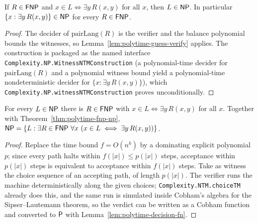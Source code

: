 \begin{theorem}
  \label{thm:polytime-fnp-np}
  \leanok
  If $R \in \mathsf{FNP}$ and $x \in L \iff \exists y\, R(x, y)$ for all $x$, then
  $L \in \mathsf{NP}$. In particular $\{x : \exists y\, R(x, y)\} \in \mathsf{NP}$ for
  every $R \in \mathsf{FNP}$.
\end{theorem}
\begin{proof}
  \leanok
  The decider of $\mathrm{pairLang}(R)$ is the verifier and the balance
  polynomial bounds the witnesses, so Lemma~\ref{lem:polytime-guess-verify}
  applies. The construction is packaged as the named interface
  \texttt{Complexity.NP.WitnessNTMConstruction} (a polynomial-time decider for
  $\mathrm{pairLang}(R)$ and a polynomial witness bound yield a
  polynomial-time nondeterministic decider for $\{x : \exists y\, R(x, y)\}$),
  which \texttt{Complexity.NP.witnessNTMConstruction} proves unconditionally.
\end{proof}

\begin{theorem}
  \label{thm:polytime-np-verifier}
  For every $L \in \mathsf{NP}$ there is $R \in \mathsf{FNP}$ with
  $x \in L \iff \exists y\, R(x, y)$ for all $x$. Together with
  Theorem~\ref{thm:polytime-fnp-np},
  $\cc{NP} = \{L : \exists R \in \cc{FNP}\ \forall x\ (x \in L \iff \exists y\,
  R(x, y))\}$.
\end{theorem}
\begin{proof}
  Replace the time bound $f = O(n^k)$ by a dominating explicit polynomial $p$;
  since every path halts within $f(|x|) \le p(|x|)$ steps, acceptance within
  $p(|x|)$ steps is equivalent to acceptance within $f(|x|)$ steps. Take as
  witness the choice sequence of an accepting path, of length $p(|x|)$. The
  verifier runs the machine deterministically along the given choices;
  \texttt{Complexity.NTM.choiceTM} already does this, and the same run is
  simulated inside Cobham's algebra for the Sipser--Lautemann theorem, so the
  verdict can be written as a Cobham function and converted to $\mathsf{P}$ with
  Lemma~\ref{lem:polytime-decision-fn}.
\end{proof}

